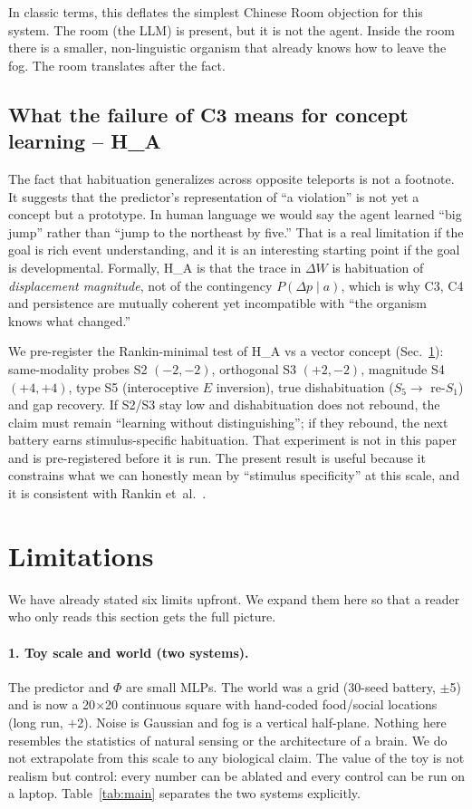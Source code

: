 \documentclass[11pt,a4paper]{article}
\begin{document}
In classic terms, this deflates the simplest Chinese Room objection for this system. The room (the LLM) is present, but it is not the agent. Inside the room there is a smaller, non-linguistic organism that already knows how to leave the fog. The room translates after the fact.

\subsection{What the failure of C3 means for concept learning -- H\_A}

The fact that habituation generalizes across opposite teleports is not a footnote. It suggests that the predictor's representation of ``a violation'' is not yet a concept but a prototype. In human language we would say the agent learned ``big jump'' rather than ``jump to the northeast by five.'' That is a real limitation if the goal is rich event understanding, and it is an interesting starting point if the goal is developmental. Formally, H\_A is that the trace in $\Delta W$ is habituation of \textit{displacement magnitude}, not of the contingency $P(\Delta p\mid a)$, which is why C3, C4 and persistence are mutually coherent yet incompatible with ``the organism knows what changed.''

We pre-register the Rankin-minimal test of H\_A vs a vector concept (Sec.~\ref{sec:limitations}): same-modality probes S2 $(-2,-2)$, orthogonal S3 $(+2,-2)$, magnitude S4 $(+4,+4)$, type S5 (interoceptive $E$ inversion), true dishabituation ($S_5\rightarrow$ re-$S_1$) and gap recovery. If S2/S3 stay low and dishabituation does not rebound, the claim must remain ``learning without distinguishing''; if they rebound, the next battery earns stimulus-specific habituation. That experiment is not in this paper and is pre-registered before it is run. The present result is useful because it constrains what we can honestly mean by ``stimulus specificity'' at this scale, and it is consistent with Rankin et~al.~\cite{rankin2009}.

\section{Limitations}
\label{sec:limitations}

We have already stated six limits upfront. We expand them here so that a reader who only reads this section gets the full picture.

\paragraph{1. Toy scale and world (two systems).} The predictor and $\Phi$ are small MLPs. The world was a grid (30-seed battery, $\pm$5) and is now a 20$\times$20 continuous square with hand-coded food/social locations (long run, $+$2). Noise is Gaussian and fog is a vertical half-plane. Nothing here resembles the statistics of natural sensing or the architecture of a brain. We do not extrapolate from this scale to any biological claim. The value of the toy is not realism but control: every number can be ablated and every control can be run on a laptop. Table~\ref{tab:main} separates the two systems explicitly.
\end{document}
